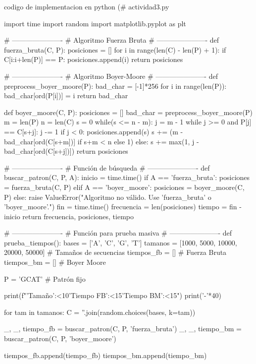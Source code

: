 \documentclass[fleqn,10pt]{article}
\begin{document}
codigo de implementacion en python  
(# actividad3.py

import time
import random
import matplotlib.pyplot as plt

# ----------------------
# Algoritmo Fuerza Bruta
# ----------------------
def fuerza_bruta(C, P):
    posiciones = []
    for i in range(len(C) - len(P) + 1):
        if C[i:i+len(P)] == P:
            posiciones.append(i)
    return posiciones

# ----------------------
# Algoritmo Boyer-Moore
# ----------------------
def preprocess_boyer_moore(P):
    bad_char = [-1]*256
    for i in range(len(P)):
        bad_char[ord(P[i])] = i
    return bad_char

def boyer_moore(C, P):
    posiciones = []
    bad_char = preprocess_boyer_moore(P)
    m = len(P)
    n = len(C)
    s = 0
    while(s <= n - m):
        j = m - 1
        while j >= 0 and P[j] == C[s+j]:
            j -= 1
        if j < 0:
            posiciones.append(s)
            s += (m - bad_char[ord(C[s+m])] if s+m < n else 1)
        else:
            s += max(1, j - bad_char[ord(C[s+j])])
    return posiciones

# ----------------------
# Función de búsqueda
# ----------------------
def buscar_patron(C, P, A):
    inicio = time.time()
    if A == 'fuerza_bruta':
        posiciones = fuerza_bruta(C, P)
    elif A == 'boyer_moore':
        posiciones = boyer_moore(C, P)
    else:
        raise ValueError("Algoritmo no válido. Use 'fuerza_bruta' o 'boyer_moore'.")
    fin = time.time()
    frecuencia = len(posiciones)
    tiempo = fin - inicio
    return frecuencia, posiciones, tiempo

# ----------------------
# Función para prueba masiva
# ----------------------
def prueba_tiempos():
    bases = ['A', 'C', 'G', 'T']
    tamanos = [1000, 5000, 10000, 20000, 50000]  # Tamaños de secuencias
    tiempos_fb = []  # Fuerza Bruta
    tiempos_bm = []  # Boyer Moore

    P = 'GCAT'  # Patrón fijo

    print(f"{'Tamaño':<10}{'Tiempo FB':<15}{'Tiempo BM':<15}")
    print('-'*40)

    for tam in tamanos:
        C = ''.join(random.choices(bases, k=tam))

        _, _, tiempo_fb = buscar_patron(C, P, 'fuerza_bruta')
        _, _, tiempo_bm = buscar_patron(C, P, 'boyer_moore')

        tiempos_fb.append(tiempo_fb)
        tiempos_bm.append(tiempo_bm)
\end{document}
